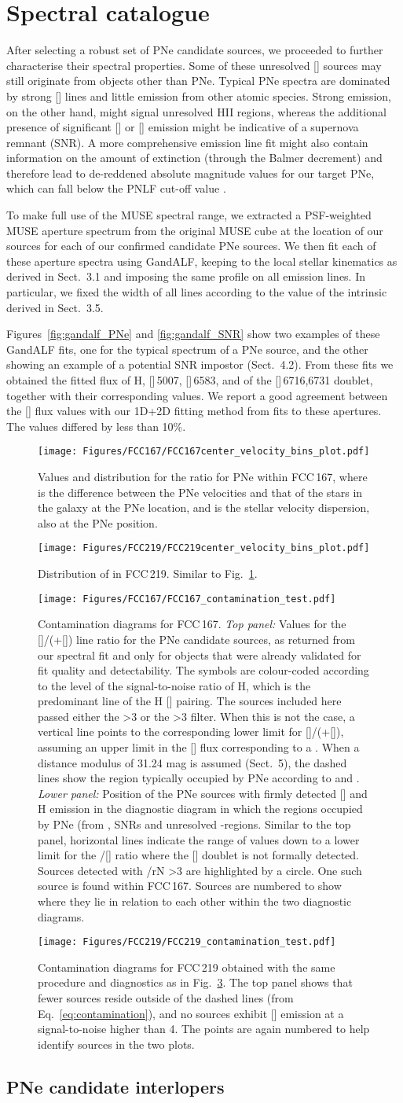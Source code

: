 \documentclass{aa}
\newcommand{\placefigvela}{
\begin{figure}
    \texttt{[image: Figures/FCC167/FCC167center\_velocity\_bins\_plot.pdf]}
    \caption{Values and distribution for the  ratio for PNe within FCC\,167, where  is the difference between the PNe velocities and that of the stars in the galaxy at the PNe location, and  is the stellar velocity dispersion, also at the PNe position.}
    \label{fig:FCC167_vel_hist}
\end{figure}
}
\newcommand{\placefigvelb}{
\begin{figure}
    \texttt{[image: Figures/FCC219/FCC219center\_velocity\_bins\_plot.pdf]}
    \caption{Distribution of  in FCC\,219. Similar to Fig.~\ref{fig:FCC167_vel_hist}.}
    \label{fig:FCC219_vel_hist}
\end{figure}
}
\newcommand{\placefigcontaminationa}{
\begin{figure}
    \texttt{[image: Figures/FCC167/FCC167\_contamination\_test.pdf]}
    \caption{Contamination diagrams for FCC\,167. {\it Top panel:} Values for the [\ion{O}{iii}]/(+[\ion{N}{ii}]) line ratio for the PNe candidate sources, as returned from our spectral fit and only for objects that were already validated for fit quality and detectability. The symbols are colour-coded according to the level of the signal-to-noise ratio of H, which is the predominant line of the H [\ion{N}{ii}] pairing. The sources included here passed either the >3 or the >3 filter. When this is not the case, a vertical line points to the corresponding lower limit for [\ion{O}{iii}]/(+[\ion{N}{ii}]), assuming an upper limit in the [\ion{N}{ii}] flux corresponding to a . When a distance modulus of 31.24 mag is assumed (Sect.~5), the dashed lines show the region typically occupied by PNe according to \citet{ciardullo_planetary_2002} and \citet{herrmann_planetary_2008}. {\it Lower panel:} Position of the PNe sources with firmly detected [\ion{N}{ii}] and H emission in the \citet{sabbadin_sharpless_1977} diagnostic diagram in which the regions occupied by PNe (from \citet{riesgo_revised_2006}, SNRs and unresolved \ion{H}{ii}-regions. Similar to the top panel, horizontal lines indicate the range of values down to a lower limit for the /[\ion{S}{ii}] ratio where the [\ion{S}{ii}] doublet is not formally detected. Sources detected with \ion{S}{ii}/rN >3 are highlighted by a circle. One such source is found within FCC\,167. Sources are numbered to show where they lie in relation to each other within the two diagnostic diagrams.}
    \label{fig:PNe_impostor167}
\end{figure}
}
\newcommand{\placefigcontaminationb}{
\begin{figure}
    \texttt{[image: Figures/FCC219/FCC219\_contamination\_test.pdf]}
    \caption{Contamination diagrams for FCC\,219 obtained with the same procedure and diagnostics as in Fig.~\ref{fig:PNe_impostor167}. The top panel shows that fewer sources reside outside of the dashed lines (from Eq.~\ref{eq:contamination}), and no sources exhibit [\ion{S}{ii}] emission at a signal-to-noise higher than 4. The points are again numbered to help identify sources in the two plots.}
    \label{fig:PNe_impostor219}
\end{figure}
}
\begin{document}
\section{Spectral catalogue}

After selecting a robust set of PNe candidate sources, we proceeded to further characterise their spectral properties. Some of these unresolved [] sources may still originate from objects other than PNe. Typical PNe spectra are dominated by strong [] lines and little emission from other atomic species. Strong  emission, on the other hand, might signal unresolved H{\sc II} regions, whereas the additional presence of significant [] or [] emission might be indicative of a supernova remnant (SNR). A more comprehensive emission line fit might also contain information on the amount of extinction (through the Balmer decrement) and therefore lead to de-reddened absolute  magnitude values for our target PNe, which can fall below the PNLF cut-off value \citep[][]{ciardullo_planetary_2012}.

To make full use of the MUSE spectral range, we extracted a PSF-weighted MUSE aperture spectrum from the original MUSE cube at the location of our sources for each of our confirmed candidate
PNe sources. We then fit each of these aperture spectra using GandALF, keeping to the local stellar kinematics as derived in Sect.~3.1 and imposing the same profile on all emission lines. In particular, we fixed the width of all lines according to the value of the intrinsic  derived in Sect.~3.5. 

Figures~\ref{fig:gandalf_PNe} and \ref{fig:gandalf_SNR} show two examples of these GandALF fits, one for the typical spectrum of a PNe source, and the other showing an example of a potential SNR impostor (Sect.~4.2). From these fits we obtained the fitted flux of H, []\,5007, []\,6583,  and of the []\,6716,6731 doublet, together with their corresponding  values. We report a good agreement between the [] flux values with our 1D+2D fitting method from fits to these apertures. The values differed by less than 10\%.

\placefigvela
\placefigvelb
\placefigcontaminationa
\placefigcontaminationb

\subsection{PNe candidate interlopers}
\end{document}
